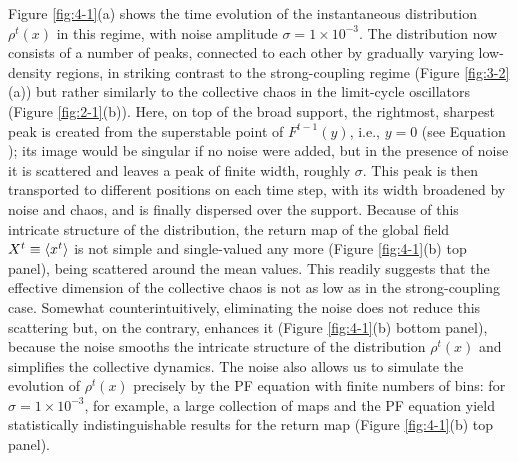 \documentclass[12pt]{iopart}
\begin{document}
Figure \ref{fig:4-1}(a) shows the
 time evolution of the instantaneous distribution $\rho^t(x)$ in this regime,
 with noise amplitude $\sigma = 1 \times 10^{-3}$.
The distribution now consists of a number of peaks,
 connected to each other by gradually varying low-density regions,
 in striking contrast to the strong-coupling regime (Figure \ref{fig:3-2}(a))
 but rather similarly to the collective chaos in the limit-cycle oscillators
 (Figure \ref{fig:2-1}(b)).
Here, on top of the broad support,
 the rightmost, sharpest peak is created
 from the superstable point of $F^{t-1}(y)$,
 i.e., $y=0$ (see Equation );
 its image would be singular if no noise were added,
 but in the presence of noise it is scattered
 and leaves a peak of finite width, roughly $\sigma$.
This peak is then transported to different positions on each time step,
 with its width broadened by noise and chaos,
 and is finally dispersed over the support.
Because of this intricate structure of the distribution,
 the return map of the global field $X^t \equiv \langle x^t \rangle$
 is not simple and single-valued any more (Figure \ref{fig:4-1}(b) top panel),
 being scattered around the mean values.
This readily suggests that
 the effective dimension of the collective chaos
 is not as low as in the strong-coupling case.
Somewhat counterintuitively,
 eliminating the noise does not reduce this scattering but, on the contrary,
 enhances it (Figure \ref{fig:4-1}(b) bottom panel),
 because the noise smooths the intricate structure
 of the distribution $\rho^t(x)$ and simplifies the collective dynamics.
The noise also allows us to simulate the evolution of $\rho^t(x)$ precisely
 by the PF equation with finite numbers of bins:
 for $\sigma = 1 \times 10^{-3}$, for example, a large collection of maps
 and the PF equation yield statistically indistinguishable results
 for the return map (Figure \ref{fig:4-1}(b) top panel).
\end{document}
